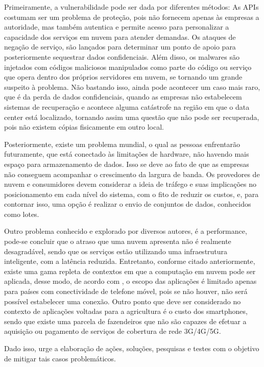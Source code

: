 \documentclass[12pt]{article}
\begin{document}
Primeiramente, a vulnerabilidade pode ser dada por diferentes métodos: As APIs costumam ser um problema de proteção, pois não fornecem apenas às empresas a autoridade, mas também autentica e permite acesso para personalizar a capacidade dos serviços em nuvem para atender demandas. Os ataques de negação de serviço, são lançados para determinar um ponto de apoio para posteriormente sequestrar dados confidenciais. Além disso, os malwares são injetados com códigos maliciosos manipulados como parte do código ou serviço que opera dentro dos próprios servidores em nuvem, se tornando um grande suspeito à problema. Não bastando isso, ainda pode acontecer um caso mais raro, que é da perda de dados confidenciais, quando as empresas não estabelecem sistemas de recuperação e acontece alguma catástrofe na região em que o data center está localizado, tornando assim uma questão que não pode ser recuperada, pois não existem cópias fisicamente em outro local.

Posteriormente, existe um problema mundial, o qual as pessoas enfrentarão futuramente, que está conectado às limitações de hardware, não havendo mais espaço para armazenamento de dados. Isso se deve ao fato de que as empresas não conseguem acompanhar o crescimento da largura de banda. Os provedores de nuvem e consumidores devem considerar a ideia de tráfego e suas implicações no posicionamento em cada nível do sistema, com o fito de reduzir os custos, e, para contornar isso, uma opção é realizar o envio de conjuntos de dados, conhecidos como lotes.

Outro problema conhecido e explorado por diversos autores, é a performance, pode-se concluir que o atraso que uma nuvem apresenta não é realmente desagradável, sendo que os serviços estão utilizando uma infraestrutura inteligente, com a latência reduzida. Entretanto, conforme citado anteriormente, existe uma gama repleta de contextos em que a computação em nuvem pode ser aplicada, desse modo, de acordo com \cite{prasad}, o escopo das aplicações é limitado apenas para países com conectividade de telefone móvel, pois se não houver, não será possível estabelecer uma conexão. Outro ponto que deve ser considerado no contexto de aplicações voltadas para a agricultura é o custo dos smartphones, sendo que existe uma parcela de fazendeiros que não são capazes de efetuar a aquisição ou pagamento de serviços de cobertura de rede 3G/4G/5G.

Dado isso, urge a elaboração de ações, soluções, pesquisas e testes com o objetivo de mitigar tais casos problemáticos.
\end{document}
